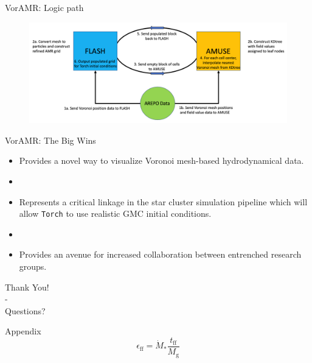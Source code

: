 \documentclass[aspectratio=169]{beamer}
\begin{document}
%
\begin{frame}{VorAMR: Logic path}
	\begin{figure}[h!]
                \centering
                \includegraphics[width=\linewidth]{../images/voramr_logic.png} \\
                \label{fig:voramr_logic}
	\end{figure}
\end{frame}
%
%
%
%
%
\begin{frame}{VorAMR: The Big Wins}{}
    \begin{itemize}
    	\item Provides a novel way to visualize Voronoi mesh-based hydrodynamical data.
	\item []
    	\item Represents a critical linkage in the star cluster simulation pipeline which will allow \texttt{Torch} to use realistic GMC initial conditions.
	\item []
	\item Provides an avenue for increased collaboration between entrenched research groups.
    \end{itemize}
\end{frame}
%
%
%
%
%
\begin{frame}{}
	\centering Thank You! \\ - \\ Questions?
\end{frame}

\begin{frame}{Appendix}
	\begin{equation}\label{eqn:sfe}
		\epsilon_{\text{ff}} = \dot{M}_{*}\frac{t_{\text{ff}}}{M_{\text{g}}}
	\end{equation}
\end{frame}
\end{document}
